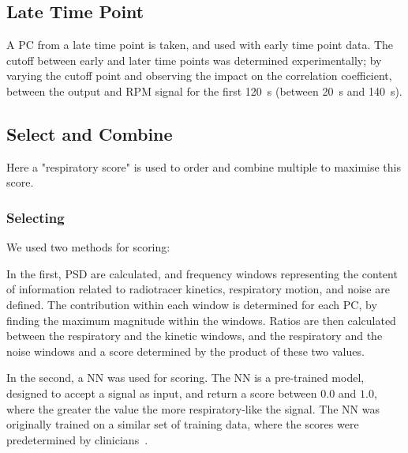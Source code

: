     \vspace{-0.5cm}
            
    \subsection{Late Time Point} \label{sec:late_time_point}
        A \gls{PC} from a late time point is taken, and used with early time point data. The cutoff between early and later time points was determined experimentally; by varying the cutoff point and observing the impact on the correlation coefficient, between the output and \gls{RPM} signal for the first \SI{120}{\second} (between \SI{20}{\second} and \SI{140}{\second}).
        
    \vspace{-0.5cm}
    
    \subsection{Select and Combine} \label{sec:select_and_combine}
        Here a "respiratory score" is used to order and combine multiple  to maximise this score.
        
        \subsubsection{Selecting } \label{sec:selecting_pcs}
              We used two methods for scoring:
              
              In the first, \gls{PSD} are calculated, and frequency windows representing the content of information related to radiotracer kinetics, respiratory motion, and noise are defined. The contribution within each window is determined for each \gls{PC}, by finding the maximum magnitude within the windows. Ratios are then calculated between the respiratory and the kinetic windows, and the respiratory and the noise windows and a score determined by the product of these two values.
        
        
            In the second, a \gls{NN} was used for scoring. The \gls{NN} is a pre-trained model, designed to accept a signal as input, and return a score between $0.0$ and $1.0$, where the greater the value the more respiratory-like the signal. The \gls{NN} was originally trained on a similar set of training data, where the scores were predetermined by clinicians~\cite{Walker2020AutomaticAI}.
        
